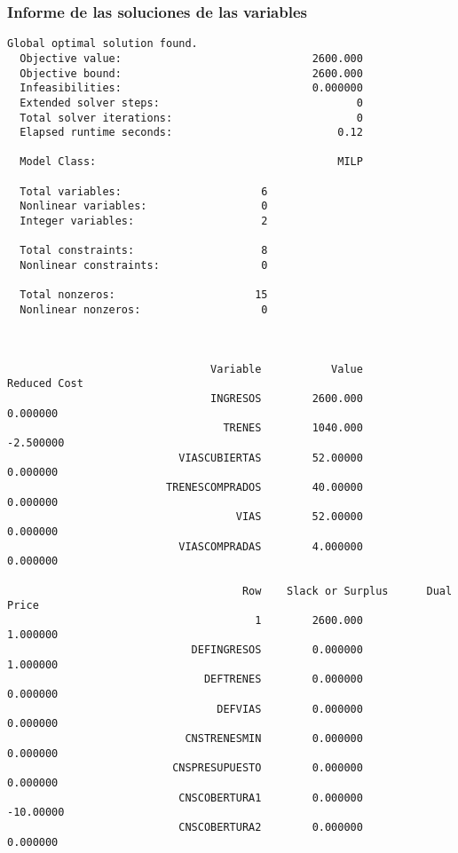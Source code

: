 \documentclass[10pt, a4paper, titlepage,
	oneside,
	fleqn, leqno]{article}
\begin{document}
\subsubsection{Informe de las soluciones de las variables}
\begin{lstlisting}
Global optimal solution found.
  Objective value:                              2600.000
  Objective bound:                              2600.000
  Infeasibilities:                              0.000000
  Extended solver steps:                               0
  Total solver iterations:                             0
  Elapsed runtime seconds:                          0.12

  Model Class:                                      MILP

  Total variables:                      6
  Nonlinear variables:                  0
  Integer variables:                    2

  Total constraints:                    8
  Nonlinear constraints:                0

  Total nonzeros:                      15
  Nonlinear nonzeros:                   0



                                Variable           Value        Reduced Cost
                                INGRESOS        2600.000            0.000000
                                  TRENES        1040.000           -2.500000
                           VIASCUBIERTAS        52.00000            0.000000
                         TRENESCOMPRADOS        40.00000            0.000000
                                    VIAS        52.00000            0.000000
                           VIASCOMPRADAS        4.000000            0.000000

                                     Row    Slack or Surplus      Dual Price
                                       1        2600.000            1.000000
                             DEFINGRESOS        0.000000            1.000000
                               DEFTRENES        0.000000            0.000000
                                 DEFVIAS        0.000000            0.000000
                            CNSTRENESMIN        0.000000            0.000000
                          CNSPRESUPUESTO        0.000000            0.000000
                           CNSCOBERTURA1        0.000000           -10.00000
                           CNSCOBERTURA2        0.000000            0.000000

\end{lstlisting}
\end{document}
